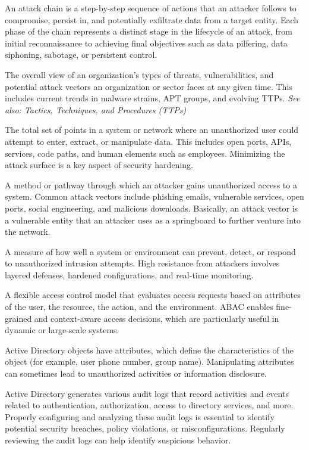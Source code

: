  An attack chain is a step-by-step sequence of actions that an attacker follows to compromise, persist in, and potentially exfiltrate data from a target entity. Each phase of the chain represents a distinct stage in the lifecycle of an attack, from initial reconnaissance to achieving final objectives such as data pilfering, data siphoning, sabotage, or persistent control.

 The overall view of an organization's types of threats, vulnerabilities, and potential attack vectors an organization or sector faces at any given time. This includes current trends in malware strains, APT groups, and evolving TTPs.
\textit{See also: Tactics, Techniques, and Procedures (TTPs)}

 The total set of points in a system or network where an unauthorized user could attempt to enter, extract, or manipulate data. This includes open ports, APIs, services, code paths, and human elements such as employees. Minimizing the attack surface is a key aspect of security hardening.

 A method or pathway through which an attacker gains unauthorized access to a system. Common attack vectors include phishing emails, vulnerable services, open ports, social engineering, and malicious downloads. Basically, an attack vector is a vulnerable entity that an attacker uses as a springboard to further venture into the network.

 A measure of how well a system or environment can prevent, detect, or respond to unauthorized intrusion attempts. High resistance from attackers involves layered defenses, hardened configurations, and real-time monitoring.

 A flexible access control model that evaluates access requests based on attributes of the user, the resource, the action, and the environment. ABAC enables fine-grained and context-aware access decisions, which are particularly useful in dynamic or large-scale systems.

 Active Directory objects have attributes, which define the characteristics of the object (for example, user phone number, group name). Manipulating attributes can sometimes lead to unauthorized activities or information disclosure.

 Active Directory generates various audit logs that record activities and events related to authentication, authorization, access to directory services, and more. Properly configuring and analyzing these audit logs is essential to identify potential security breaches, policy violations, or misconfigurations. Regularly reviewing the audit logs can help identify suspicious behavior.

